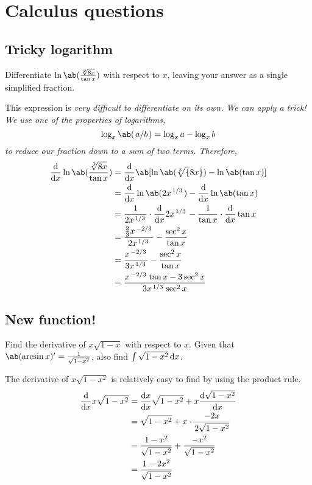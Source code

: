 \chapter{Calculus questions}
\section{Tricky logarithm}
Differentiate \(\ln \ab(\frac{\sqrt[3]{8x}}{\tan x})\) with respect to \(x\),
leaving your answer as a single simplified fraction.

This expression is \it{very} difficult to differentiate on its own.
We can apply a trick! We use one of the properties of logarithms,
\begin{equation*}
	\log_x \ab(\cf{a}{b}) = \log_x a - \log_x b
\end{equation*}
to reduce our fraction down to a sum of two terms. Therefore,
\begin{align*}
	\odv{}{x} \ln \ab(\frac{\sqrt[3]{8x}}{\tan x}) & = \odv{}{x} \ab[\ln \ab(\sqrt[3]{8x}) - \ln \ab(\tan x)]                                            \\
	                                               & = \odv{}{x} \ln \ab(2x^{\cf{1}{3}}) - \odv{}{x} \ln \ab(\tan x)                                     \\
	                                               & = \frac{1}{2x^{\cf{1}{3}}} \cdot \odv{}{x} 2x^{\cf{1}{3}} - \frac{1}{\tan x} \cdot \odv{}{x} \tan x \\
	                                               & = \frac{\frac{2}{3}x^{\cf{-2}{3}}}{2x^{\cf{1}{3}}} - \frac{\sec^2 x}{\tan x}                        \\
	                                               & = \frac{x^{\cf{-2}{3}}}{3x^{\cf{1}{3}}} - \frac{\sec^2 x}{\tan x}                                   \\
	                                               & = \frac{x^{\cf{-2}{3}} \tan x - 3 \sec^2 x}{3x^{\cf{1}{3}} \sec^2 x}
\end{align*}

\section{New function!}
Find the derivative of \(x\sqrt{1-x}\) with respect to \(x\).
Given that \(\ab(\arcsin x)' = \frac{1}{\sqrt{1-x^2}}\), also find \(\int \sqrt{1-x^2} \odif{x}\).

The derivative of \(x\sqrt{1-x^2}\) is relatively easy to find by using the product rule.
\begin{align*}
	\odv{}{x} x\sqrt{1-x^2} & = \odv{x}{x} \sqrt{1-x^2} + x \odv{\sqrt{1-x^2}}{x}      \\
	                        & = \sqrt{1-x^2} + x \cdot \frac{-2x}{2\sqrt{1-x^2}}       \\
	                        & = \frac{1-x^2}{\sqrt{1-x^2}} + \frac{-x^2}{\sqrt{1-x^2}} \\
	                        & = \frac{1-2x^2}{\sqrt{1-x^2}}
\end{align*}

